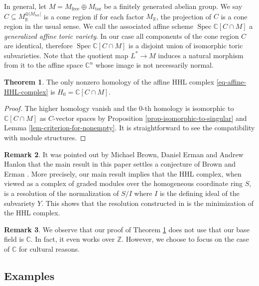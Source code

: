 \documentclass[11pt,reqno]{amsart}
\def\C {{\mathbb C}}
\def\R {{\mathbb R}}
\def\Z {{\mathbb Z}}
\theoremstyle{definition}
\newtheorem{theorem}{Theorem}[section]
\newtheorem{remark}[theorem]{Remark}
\numberwithin{equation}{section}
\begin{document}
\smallskip

In general, let $M = M_{\mathrm{free}}\oplus M_{\mathrm{tor}}$ be a finitely generated abelian group. We say $C\subseteq M_{\R}^{\oplus|M_{\mathrm{tor}}|}$ is a cone region if for each factor $M_{\R}$, the projection of $C$ is a cone region in the usual sense. We call the associated affine scheme $\operatorname{Spec}\C[C\cap M]$ a \textit{generalized affine toric variety}. In our case all components of the cone region $C$ are identical, therefore $\operatorname{Spec}\C[C\cap M]$ is a disjoint union of isomorphic toric subvarieties. Note that the quotient map $L^*\rightarrow M$ induces a natural morphism from it to the affine space $\C^n$ whose image is not necessarily normal.





\begin{theorem}\label{thm-1}
    The only nonzero homology of the affine HHL complex \eqref{eq-affine-HHL-complex} is $H_0=\C[C\cap M]$. 
\end{theorem}
\begin{proof}
    The higher homology vanish and the 0-th homology is isomorphic to $\C[C\cap M]$ as $C$-vector spaces by Proposition \ref{prop-isomorphic-to-singular} and Lemma \ref{lem-criterion-for-nonempty}. It is straightforward to see the compatibility with module structures.
\end{proof}

\begin{remark}\label{rmk-BE-conjecture}
    It was pointed out by Michael Brown, Daniel Erman and Andrew Hanlon that the main result in this paper settles a conjecture of Brown and Erman \cite[p.3]{BE}. More precisely, our main result implies that the HHL complex, when viewed as a complex of graded modules over the homogeneous coordinate ring $S$, is a resolution of the normalization of $S/I$ where $I$ is the defining ideal of the subvariety $Y$. This shows that the resolution constructed in \cite{BE} is the minimization of the HHL complex.
\end{remark}

\begin{remark}
We observe that our proof of Theorem \ref{thm-1} does not use that our base field is $\C$. In fact, it even works over $\Z$. However, we choose to focus on the case of $\C$ for cultural reasons.
\end{remark}


\subsection{Examples}
\end{document}
